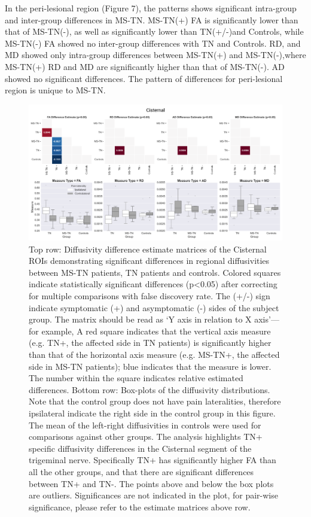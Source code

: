 In the peri-lesional region (Figure 7), the patterns shows significant intra-group and inter-group differences in MS-TN. MS-TN(+) FA is significantly lower than that of MS-TN(-), as well as significantly lower than TN(+/-)and Controls, while MS-TN(-) FA showed no inter-group differences with TN and Controls. RD, and MD showed only intra-group differences between MS-TN(+) and MS-TN(-),where MS-TN(+) RD and MD are significantly higher than that of MS-TN(-). AD showed no significant differences. The pattern of differences for peri-lesional region is unique to MS-TN. 

\begin{figure}[p]
\includegraphics[width=\textwidth]{figure4.png}
\caption{Top row: Diffusivity difference estimate matrices of the Cisternal ROIs demonstrating significant differences in regional diffusivities between MS-TN patients, TN patients and controls. Colored squares indicate statistically significant differences (p\textless 0.05) after correcting for multiple comparisons with false discovery rate. The (+/-) sign indicate symptomatic (+) and asymptomatic (-) sides of the subject group. The matrix should be read as ‘Y axis in relation to X axis’—for example, A red square indicates that the vertical axis measure (e.g. TN+, the affected side in TN patients) is significantly higher than that of the horizontal axis measure (e.g. MS-TN+, the affected side in MS-TN patients); blue indicates that the measure is lower. The number within the square indicates relative estimated differences. Bottom row: Box-plots of the diffusivity distributions. Note that the control group does not have pain lateralities, therefore ipsilateral indicate the right side in the control group in this figure. The mean of the left-right diffusivities in controls were used for comparisons against other groups. The analysis highlights TN+ specific diffusivity differences in the Cisternal segment of the trigeminal nerve. Specifically TN+ has significantly higher FA than all the other groups, and that there are significant differences between TN+ and TN-. The points above and below the box plots are outliers. Significances are not indicated in the plot, for pair-wise significance, please refer to the estimate matrices above row.}
\centering
\label{fig:MSfigure4}
\end{figure}

